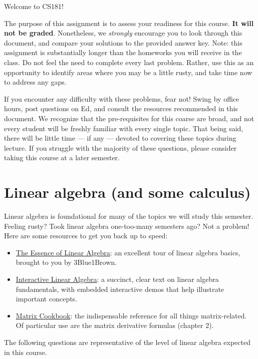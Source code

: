 \documentclass{harvardml}
\theoremstyle{definition}
\theoremstyle{plain}
\begin{document}
Welcome to CS181! 

The purpose of this assignment is to assess your readiness for
this course. \textbf{It will not be graded}. Nonetheless, we \textit{strongly}
encourage you to look through this document, and compare your solutions to the
provided answer key. Note: this assignment is substantially longer than the
homeworks you will receive in the class. Do not feel the need to complete every
last problem. Rather, use this as an opportunity to identify areas where you may
be a little rusty, and take time now to address any gaps.

If you encounter any difficulty with these problems, fear not! Swing by office
hours, post questions on Ed, and consult the resources recommended in this
document. We recognize that the pre-requisites for this coarse are broad, and 
not every student will be freshly familiar with every single topic. That 
being said, there will be little time --- if any --- devoted to covering these 
topics during lecture. If you struggle with the majority of these questions,
please consider taking this course at a later semester.

\section{Linear algebra (and some calculus)}
Linear algebra is foundational for many of the topics we will study this
semester. Feeling rusty? Took linear algebra one-too-many semesters ago? Not a
problem! Here are some resources to get you back up to speed:

\begin{itemize}
	\item
	\href{https://www.youtube.com/watch?v=kjBOesZCoqc&list=PL0-GT3co4r2y2YErbmuJw2L5tW4Ew2O5B}{The
	Essence of Linear Algebra}: an excellent tour of linear algebra basics,
	brought to you by 3Blue1Brown.
	\item \href{https://textbooks.math.gatech.edu/ila/index2.html}{Interactive
	Linear Algebra}: a succinct, clear text on linear algebra fundamentals, with
	embedded interactive demos that help illustrate important concepts.
	\item \href{https://www.math.uwaterloo.ca/~hwolkowi/matrixcookbook.pdf}{Matrix Cookbook}:
	the indispensable reference for all things matrix-related. Of particular
	use are the matrix derivative formulas (chapter 2).
\end{itemize}

The following questions are representative of the level of linear algebra expected
in this course. \\
\end{document}
